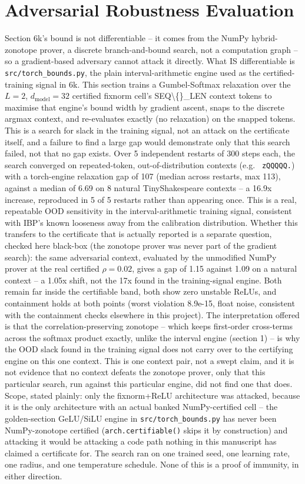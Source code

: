\documentclass[10pt,journal]{IEEEtran}
\begin{document}
\section{Adversarial Robustness Evaluation}
Section 6k's bound is not differentiable -- it comes from the NumPy hybrid-zonotope prover, a discrete branch-and-bound search, not a computation graph -- so a gradient-based adversary cannot attack it directly. What IS differentiable is \texttt{src/torch\_bounds.py}, the plain interval-arithmetic engine used as the certified-training signal in 6k. This section trains a Gumbel-Softmax relaxation over the $L=2$, $d_{\text{model}}=32$ certified fixnorm cell's SEQ\textbackslash\{\}\_LEN context tokens to maximise that engine's bound width by gradient ascent, snaps to the discrete argmax context, and re-evaluates exactly (no relaxation) on the snapped tokens. This is a search for slack in the training signal, not an attack on the certificate itself, and a failure to find a large gap would demonstrate only that this search failed, not that no gap exists.
Over 5 independent restarts of 300 steps each, the search converged on repeated-token, out-of-distribution contexts (e.g. \texttt{ zQQQQQ.}) with a torch-engine relaxation gap of 107 (median across restarts, max 113), against a median of 6.69 on 8 natural TinyShakespeare contexts -- a 16.9x increase, reproduced in 5 of 5 restarts rather than appearing once. This is a real, repeatable OOD sensitivity in the interval-arithmetic training signal, consistent with IBP's known looseness away from the calibration distribution.
Whether this transfers to the certificate that is actually reported is a separate question, checked here black-box (the zonotope prover was never part of the gradient search): the same adversarial context, evaluated by the unmodified NumPy prover at the real certified $\rho=0.02$, gives a gap of 1.15 against 1.09 on a natural context -- a 1.05x shift, not the 17x found in the training-signal engine. Both remain far inside the certifiable band, both show zero unstable ReLUs, and containment holds at both points (worst violation 8.9e-15, float noise, consistent with the containment checks elsewhere in this project). The interpretation offered is that the correlation-preserving zonotope -- which keeps first-order cross-terms across the softmax product exactly, unlike the interval engine (section 1) -- is why the OOD slack found in the training signal does not carry over to the certifying engine on this one context. This is one context pair, not a swept claim, and it is not evidence that no context defeats the zonotope prover, only that this particular search, run against this particular engine, did not find one that does.
Scope, stated plainly: only the fixnorm+ReLU architecture was attacked, because it is the only architecture with an actual banked NumPy-certified cell -- the golden-section GeLU/SiLU engine in \texttt{src/torch\_bounds.py} has never been NumPy-zonotope certified (\texttt{arch.certifiable()} skips it by construction) and attacking it would be attacking a code path nothing in this manuscript has claimed a certificate for. The search ran on one trained seed, one learning rate, one radius, and one temperature schedule. None of this is a proof of immunity, in either direction.
\end{document}
